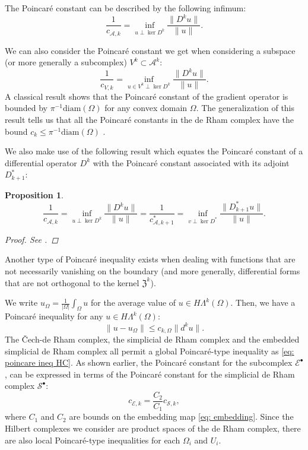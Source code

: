 \documentclass[reqno]{amsart}
\numberwithin{equation}{section}
\newtheorem{proposition}[theorem]{Proposition}
\theoremstyle{definition}
\newcommand{\Ac}{\mathcal{A}}
\newcommand{\Ec}{\mathcal{E}}
\newcommand{\Sc}{\mathcal{S}}
\newcommand{\Zf}{\mathfrak{Z}}
\begin{document}
The Poincaré constant can be described by the following infimum:
\begin{equation}\label{eq: pc full}
\frac{1}{c_{\Ac, k}} = \inf_{u \perp \ker D^k } \frac{\|D^ku\|}{\|u\|}.
\end{equation}

We can also consider the Poincaré constant we get when considering a subspace (or more generally a subcomplex) $V^k \subset \Ac^k$:
\begin{equation}\label{eq: pc subspace}
\frac{1}{c_{V,k}} = \inf_{u \in V^k \perp \ker D^k} \frac{\|D^ku\|}{\|u\|}.
\end{equation}
A classical result \cite{payne1960optimal} shows that the Poincaré constant of the gradient operator is bounded by $\pi^{-1} \mathrm{diam}(\Omega)$ for any convex domain $\Omega$. The generalization of this result tells us that all the Poincaré constants in the de Rham complex have the bound $c_k \leq \pi^{-1} \mathrm{diam}(\Omega)$ \cite{pauly2020poincare}.

We also make use of the following result which equates the Poincaré constant of a differential operator $D^k$ with the Poincaré constant associated with its adjoint $D^*_{k+1}$:
\begin{proposition}
\begin{equation}
\frac{1}{c_{\Ac,k}} = \inf_{u \perp \ker D^k} \frac{\|D^ku\|}{\|u\|} =\frac{1}{c_{\Ac, k+1}^*} =  \inf_{v \perp \ker D^*} \frac{\|D^*_{k+1}u\|}{\|u\|}.
\end{equation}
\begin{proof}
See \cite[Lemma 2.2]{pauly2020solution}.
\end{proof}
\end{proposition}

Another type of Poincaré inequality exists when dealing with functions that are not necessarily vanishing on the boundary (and more generally, differential forms that are not orthogonal to the kernel $\Zf^{k}$).

We write $u_\Omega = \frac{1}{|\Omega|}\int_\Omega u$ for the average value of $u \in H\Lambda^k(\Omega)$. Then, we have a Poincaré inequality for any $u \in H\Lambda^k(\Omega)$:
\begin{equation}
\|u - u_\Omega\|\leq c_{k,\Omega} \|d^k u\|.
\end{equation}
The \v{C}ech-de Rham complex, the simplicial de Rham complex and the embedded simplicial de Rham complex all permit a global Poincaré-type inequality as \cref{eq: poincare ineq HC}. As shown earlier, the Poincaré constant for the subcomplex $\Ec^\bullet$, can be expressed in terms of the Poincaré constant for the simplicial de Rham complex $\Sc^\bullet$: 
\begin{equation}
c_{\Ec,k} = \frac{C_2}{C_1} c_{\Sc,k},
\end{equation}
where $C_1$ and $C_2$ are bounds on the embedding map \cref{eq: embedding}. Since the Hilbert complexes we consider are product spaces of the de Rham complex, there are also local Poincaré-type inequalities for each $\Omega_i$ and $U_i$.
\end{document}
